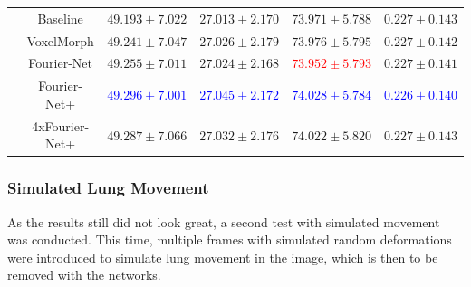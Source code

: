 \begin{table}[h]
\begin{tabular}{c c c c c c}
		\midrule		
		\multirow{5}{*}{\rotatebox{90}{$R=10$}} & Baseline & $49.193 \pm 7.022$ & $27.013 \pm 2.170$ & $73.971 \pm 5.788$ & $0.227 \pm 0.143$ \\  
		 & VoxelMorph & $49.241 \pm 7.047$ & $27.026 \pm 2.179$ & $73.976 \pm 5.795$ & $0.227 \pm 0.142$ \\  
		 & Fourier-Net & $49.255 \pm 7.011$ & $27.024 \pm 2.168$ & \textcolor{red}{$73.952 \pm 5.793$} & $0.227 \pm 0.141$ \\  
		 & Fourier-Net+ & \textcolor{blue}{$49.296 \pm 7.001$} & \textcolor{blue}{$27.045 \pm 2.172$} & \textcolor{blue}{$74.028 \pm 5.784$} & \textcolor{blue}{$0.226 \pm 0.140$} \\   
		 & 4xFourier-Net+ & $49.287 \pm 7.066$ & $27.032 \pm 2.176$ & $74.022 \pm 5.820$ & $0.227 \pm 0.143$ \\ 
		 \bottomrule
	\end{tabular}
\end{table}

\subsubsection{Simulated Lung Movement}
As the results still did not look great, a second test with simulated movement was conducted. This time, multiple frames with simulated random deformations were introduced to simulate lung movement in the image, which is then to be removed with the networks.


